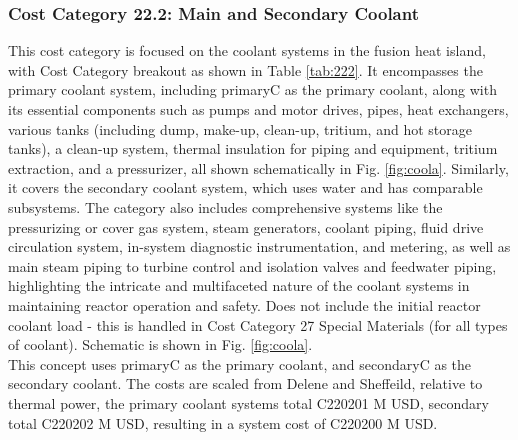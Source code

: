 \subsubsection{Cost Category 22.2: Main and Secondary Coolant} 

This cost category is focused on the coolant systems in the fusion heat island, with Cost Category breakout as shown in Table \ref{tab:222}. It encompasses the primary coolant system, including primaryC as the primary coolant, along with its essential components such as pumps and motor drives, pipes, heat exchangers, various tanks (including dump, make-up, clean-up, tritium, and hot storage tanks), a clean-up system, thermal insulation for piping and equipment, tritium extraction, and a pressurizer, all shown schematically in Fig. \ref{fig:coola}. Similarly, it covers the secondary coolant system, which uses water and has comparable subsystems.  The category also includes comprehensive systems like the pressurizing or cover gas system, steam generators, coolant piping, fluid drive circulation system, in-system diagnostic instrumentation, and metering, as well as main steam piping to turbine control and isolation valves and feedwater piping, highlighting the intricate and multifaceted nature of the coolant systems in maintaining reactor operation and safety.  Does not include the initial reactor coolant load - this is handled in  Cost Category 27 Special Materials (for all types of coolant). Schematic is shown in Fig. \ref{fig:coola}. \\




This concept uses primaryC as the primary coolant, and secondaryC as the secondary coolant. The costs are scaled from Delene and Sheffeild, relative to thermal power, the primary coolant systems total C220201 M USD, secondary total C220202 M USD, resulting in a system cost of C220200 M USD. \\


